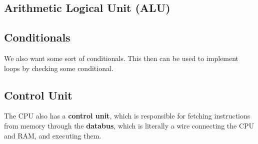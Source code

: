   \begin{theorem}
    
  \end{theorem}

\subsection{Arithmetic Logical Unit (ALU)}

\subsection{Conditionals}

  We also want some sort of conditionals. This then can be used to implement loops by checking some conditional. 

  \begin{theorem}
    
  \end{theorem}

\subsection{Control Unit} 

  The CPU also has a \textbf{control unit}, which is responsible for fetching instructions from memory through the \textbf{databus}, which is literally a wire connecting the CPU and RAM, and executing them. 

